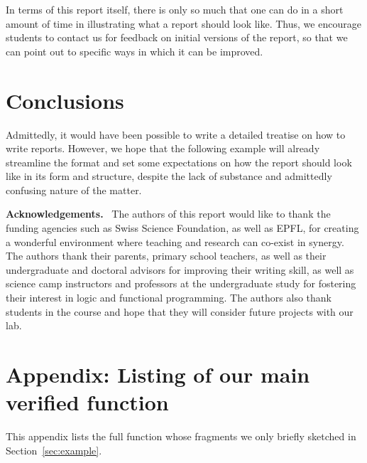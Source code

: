 \documentclass[a4paper,UKenglish,cleveref, autoref, thm-restate]{lipics-v2021}
\begin{document}
In terms of this report itself, there is only so much that
one can do in a short amount of time in illustrating what a
report should look like. Thus, we encourage students to contact
us for feedback on initial versions of the report, so that we can
point out to specific ways in which it can be improved.

\section{Conclusions}

Admittedly, it would have been possible to write a detailed
treatise on how to write reports. However, we hope that the
following example will already streamline the format and set
some expectations on how the report should look like in its
form and structure, despite the lack of substance and
admittedly confusing nature of the matter.

\vspace{0.5cm} %
\noindent %
\textbf{\large Acknowledgements.}\ %
The authors of this report would like to thank the funding agencies such as Swiss Science Foundation, as well as EPFL,
  for creating a wonderful environment where teaching and research can co-exist in synergy.
  The authors thank their parents, primary school teachers, as well as their undergraduate and doctoral advisors
  for improving their writing skill, as well as science camp instructors and professors at the undergraduate
  study for fostering their interest in logic and functional programming. The authors also
  thank students in the course and hope that they will consider future projects with our lab.



\appendix %

\section{Appendix: Listing of our main verified function}\label{app:verifiedFunction}

This appendix lists the full function whose fragments we only briefly sketched in Section~\ref{sec:example}.
\end{document}
